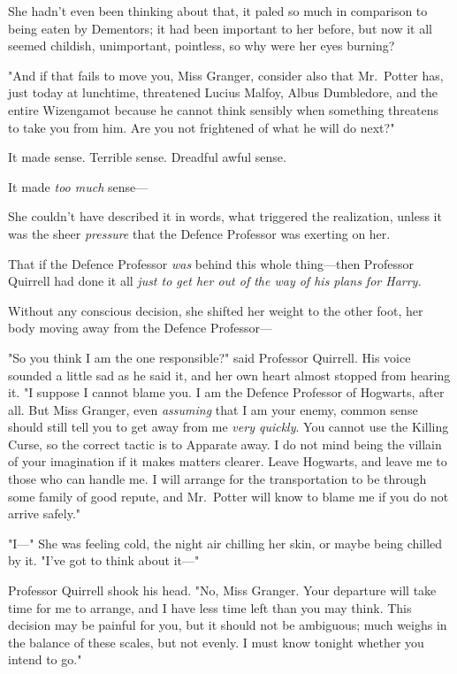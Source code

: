 She hadn't even been thinking about that, it paled so much in comparison to
being eaten by Dementors; it had been important to her before, but now it all
seemed childish, unimportant, pointless, so why were her eyes burning?

"And if that fails to move you, Miss Granger, consider also that Mr.~Potter
has, just today at lunchtime, threatened Lucius Malfoy, Albus Dumbledore, and
the entire Wizengamot because he cannot think sensibly when something threatens
to take you from him. Are you not frightened of what he will do next?"

It made sense. Terrible sense. Dreadful awful sense.

It made \emph{too much} sense---

She couldn't have described it in words, what triggered the realization, unless
it was the sheer \emph{pressure} that the Defence Professor was exerting on her.

That if the Defence Professor \emph{was} behind this whole thing---then
Professor Quirrell had done it all \emph{just to get her out of the way of his
plans for Harry.}

Without any conscious decision, she shifted her weight to the other foot, her
body moving away from the Defence Professor---

"So you think I am the one responsible?" said Professor Quirrell. His voice
sounded a little sad as he said it, and her own heart almost stopped from
hearing it. "I suppose I cannot blame you. I am the Defence Professor of
Hogwarts, after all. But Miss Granger, even \emph{assuming} that I am your
enemy, common sense should still tell you to get away from me \emph{very
quickly}. You cannot use the Killing Curse, so the correct tactic is to
Apparate away. I do not mind being the villain of your imagination if it makes
matters clearer. Leave Hogwarts, and leave me to those who can handle me. I
will arrange for the transportation to be through some family of good repute,
and Mr.~Potter will know to blame me if you do not arrive safely."

"I---" She was feeling cold, the night air chilling her skin, or maybe being
chilled by it. "I've got to think about it---"

Professor Quirrell shook his head. "No, Miss Granger. Your departure will take
time for me to arrange, and I have less time left than you may think. This
decision may be painful for you, but it should not be ambiguous; much weighs in
the balance of these scales, but not evenly. I must know tonight whether you
intend to go."

